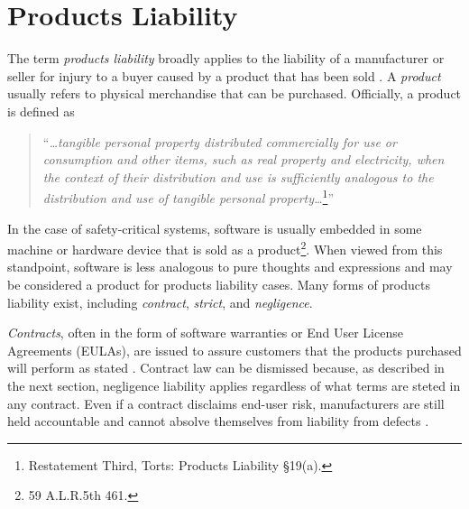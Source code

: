 \section{Products Liability}\label{S:Liability}
The term \textit{products liability} broadly applies to the liability of a
manufacturer or seller for injury to a buyer caused by a product that has been
sold \cite{Prosser}. A \textit{product} usually refers to physical 
merchandise that can be purchased. Officially, a product is defined as 
\begin{quote}
``\textit{\ldots tangible personal property distributed commercially for use or
consumption and other items, such as real property and electricity, when the
context of their distribution and use is sufficiently analogous to the
distribution and use of tangible personal property\ldots}\footnote{Restatement
Third, Torts: Products Liability \S 19(a).}''
\end{quote}

In the case of safety-critical systems, software is usually embedded in
some machine or hardware device \cite{Leveson95} that is sold as a 
product\footnote{59 A.L.R.5th 461.}. When viewed from this standpoint, software
is less analogous to pure thoughts and expressions and may be considered a
product for products liability cases. Many forms of
products liability exist, including \textit{contract}, \textit{strict}, and
\textit{negligence}.

\textit{Contracts}, often in the form of software warranties or End User License
Agreements (EULAs), are issued to assure customers that the products purchased
will perform as stated \cite{Armour93}. Contract law can be dismissed because,
as described in the next section, negligence liability applies regardless of
what terms are steted in any contract. Even if a contract disclaims end-user
risk, manufacturers are still held accountable and cannot absolve themselves
from liability from defects \cite{Ryan03}.


